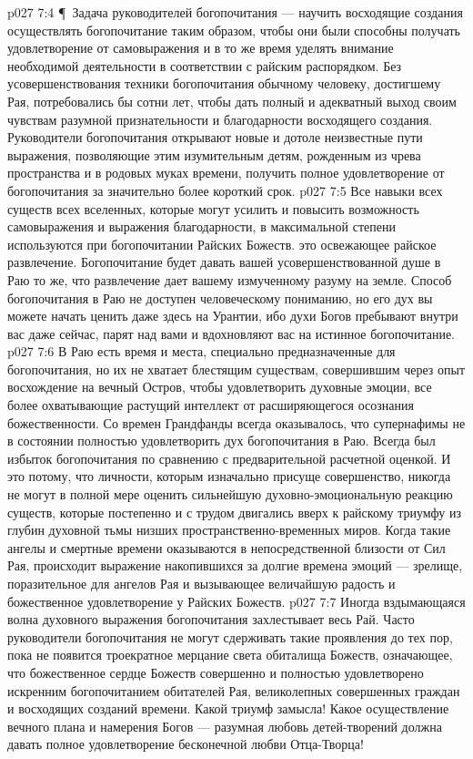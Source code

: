 \vs p027 7:4 \P\ Задача руководителей богопочитания --- научить восходящие создания осуществлять богопочитание таким образом, чтобы они были способны получать удовлетворение от самовыражения и в то же время уделять внимание необходимой деятельности в соответствии с райским распорядком. Без усовершенствования техники богопочитания обычному человеку, достигшему Рая, потребовались бы сотни лет, чтобы дать полный и адекватный выход своим чувствам разумной признательности и благодарности восходящего создания. Руководители богопочитания открывают новые и дотоле неизвестные пути выражения, позволяющие этим изумительным детям, рожденным из чрева пространства и в родовых муках времени, получить полное удовлетворение от богопочитания за значительно более короткий срок.
\vs p027 7:5 Все навыки всех существ всех вселенных, которые могут усилить и повысить возможность самовыражения и выражения благодарности, в максимальной степени используются при богопочитании Райских Божеств.  это освежающее райское развлечение. Богопочитание будет давать вашей усовершенствованной душе в Раю то же, что развлечение дает вашему измученному разуму на земле. Способ богопочитания в Раю не доступен человеческому пониманию, но его дух вы можете начать ценить даже здесь на Урантии, ибо духи Богов пребывают внутри вас даже сейчас, парят над вами и вдохновляют вас на истинное богопочитание.
\vs p027 7:6 В Раю есть время и места, специально предназначенные для богопочитания, но их не хватает блестящим существам, совершившим через опыт восхождение на вечный Остров, чтобы удовлетворить духовные эмоции, все более охватывающие растущий интеллект от расширяющегося осознания божественности. Со времен Грандфанды всегда оказывалось, что супернафимы не в состоянии полностью удовлетворить дух богопочитания в Раю. Всегда был избыток богопочитания по сравнению с предварительной расчетной оценкой. И это потому, что личности, которым изначально присуще совершенство, никогда не могут в полной мере оценить сильнейшую духовно\hyp{}эмоциональную реакцию существ, которые постепенно и с трудом двигались вверх к райскому триумфу из глубин духовной тьмы низших пространственно\hyp{}временных миров. Когда такие ангелы и смертные времени оказываются в непосредственной близости от Сил Рая, происходит выражение накопившихся за долгие времена эмоций --- зрелище, поразительное для ангелов Рая и вызывающее величайшую радость и божественное удовлетворение у Райских Божеств.
\vs p027 7:7 Иногда вздымающаяся волна духовного выражения богопочитания захлестывает весь Рай. Часто руководители богопочитания не могут сдерживать такие проявления до тех пор, пока не появится троекратное мерцание света обиталища Божеств, означающее, что божественное сердце Божеств совершенно и полностью удовлетворено искренним богопочитанием обитателей Рая, великолепных совершенных граждан и восходящих созданий времени. Какой триумф замысла! Какое осуществление вечного плана и намерения Богов --- разумная любовь детей\hyp{}творений должна давать полное удовлетворение бесконечной любви Отца\hyp{}Творца!
